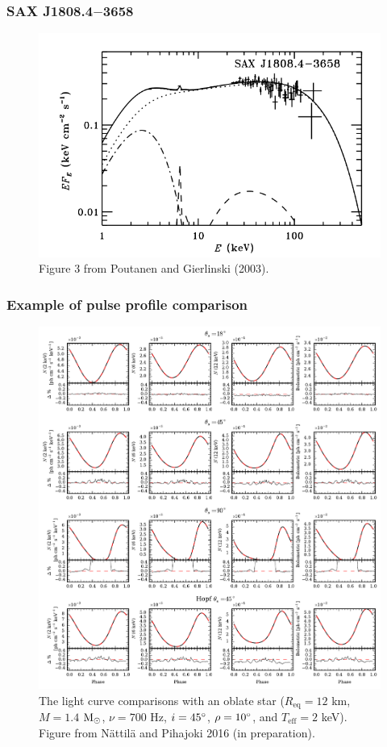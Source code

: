 \documentclass{beamer}
\def\msun{{\rm M_{\odot}}}
\begin{document}

\begin{frame}
\frametitle{SAX J1808.4$-$3658}

\begin{figure}
\includegraphics[width=0.8\linewidth]{spectrum_sax.png}
\caption{Figure 3 from Poutanen and Gierlinski (2003).}
\end{figure}

\end{frame}






\iffalse

\begin{frame}
\frametitle{Example of pulse profile comparison}

\begin{figure}
\includegraphics[width=0.5\linewidth]{jpulsec3.pdf}
\caption{The light curve comparisons with an oblate star ($R_{\mathrm{eq}} = 12$ km, $M = 1.4$ $\msun$, $\nu = 700$ Hz, $i = 45 \degree$, $\rho = 10 \degree$, and $T_{\mathrm{eff}} = 2$ keV). Figure from Nättilä and Pihajoki 2016 (in preparation).}
\end{figure}

\end{frame}
\end{document}
